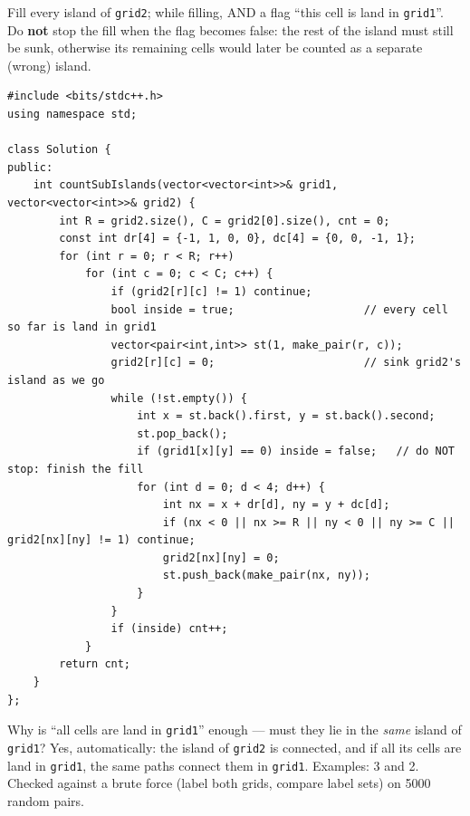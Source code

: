\begin{solutionbox}
Fill every island of \texttt{grid2}; while filling, AND a flag ``this cell is land in \texttt{grid1}''. Do \textbf{not} stop the fill when the flag becomes false: the rest of the island must still be sunk, otherwise its remaining cells would later be counted as a separate (wrong) island.
\begin{lstlisting}[style=cpp]
#include <bits/stdc++.h>
using namespace std;

class Solution {
public:
    int countSubIslands(vector<vector<int>>& grid1, vector<vector<int>>& grid2) {
        int R = grid2.size(), C = grid2[0].size(), cnt = 0;
        const int dr[4] = {-1, 1, 0, 0}, dc[4] = {0, 0, -1, 1};
        for (int r = 0; r < R; r++)
            for (int c = 0; c < C; c++) {
                if (grid2[r][c] != 1) continue;
                bool inside = true;                    // every cell so far is land in grid1
                vector<pair<int,int>> st(1, make_pair(r, c));
                grid2[r][c] = 0;                       // sink grid2's island as we go
                while (!st.empty()) {
                    int x = st.back().first, y = st.back().second;
                    st.pop_back();
                    if (grid1[x][y] == 0) inside = false;   // do NOT stop: finish the fill
                    for (int d = 0; d < 4; d++) {
                        int nx = x + dr[d], ny = y + dc[d];
                        if (nx < 0 || nx >= R || ny < 0 || ny >= C || grid2[nx][ny] != 1) continue;
                        grid2[nx][ny] = 0;
                        st.push_back(make_pair(nx, ny));
                    }
                }
                if (inside) cnt++;
            }
        return cnt;
    }
};
\end{lstlisting}
Why is ``all cells are land in \texttt{grid1}'' enough --- must they lie in the \emph{same} island of \texttt{grid1}? Yes, automatically: the island of \texttt{grid2} is connected, and if all its cells are land in \texttt{grid1}, the same paths connect them in \texttt{grid1}. Examples: 3 and 2. Checked against a brute force (label both grids, compare label sets) on 5000 random pairs.
\end{solutionbox}

